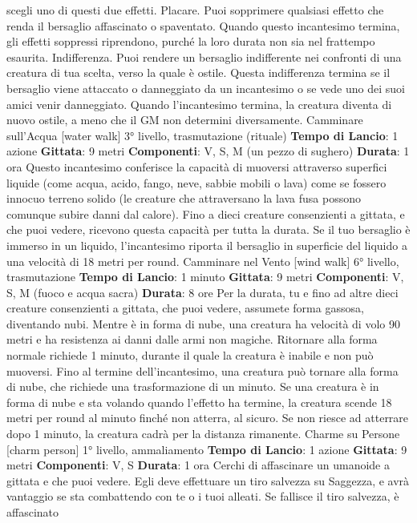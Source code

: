 \begin{multicols}{2}
scegli uno di questi due effetti.
Placare. Puoi sopprimere qualsiasi effetto che renda il
bersaglio affascinato o spaventato. Quando questo
incantesimo termina, gli effetti soppressi riprendono,
purché la loro durata non sia nel frattempo esaurita.
Indifferenza. Puoi rendere un bersaglio indifferente nei
confronti di una creatura di tua scelta, verso la quale è
ostile. Questa indifferenza termina se il bersaglio viene
attaccato o danneggiato da un incantesimo o se vede
uno dei suoi amici venir danneggiato. Quando
l’incantesimo termina, la creatura diventa di nuovo
ostile, a meno che il GM non determini diversamente.
Camminare sull’Acqua
[water walk]
3° livello, trasmutazione (rituale)
\textbf{Tempo di Lancio}: 1 azione
\textbf{Gittata}: 9 metri
\textbf{Componenti}: V, S, M (un pezzo di sughero)
\textbf{Durata}: 1 ora
Questo incantesimo conferisce la capacità di muoversi
attraverso superfici liquide (come acqua, acido, fango,
neve, sabbie mobili o lava) come se fossero innocuo
terreno solido (le creature che attraversano la lava fusa
possono comunque subire danni dal calore). Fino a
dieci creature consenzienti a gittata, e che puoi vedere,
ricevono questa capacità per tutta la durata.
Se il tuo bersaglio è immerso in un liquido,
l’incantesimo riporta il bersaglio in superficie del liquido
a una velocità di 18 metri per round.
Camminare nel Vento
[wind walk]
6° livello, trasmutazione
\textbf{Tempo di Lancio}: 1 minuto
\textbf{Gittata}: 9 metri
\textbf{Componenti}: V, S, M (fuoco e acqua sacra)
\textbf{Durata}: 8 ore
Per la durata, tu e fino ad altre dieci creature
consenzienti a gittata, che puoi vedere, assumete forma
gassosa, diventando nubi. Mentre è in forma di nube,
una creatura ha velocità di volo 90 metri e ha resistenza
ai danni dalle armi non magiche. Ritornare alla forma
normale richiede 1 minuto, durante il quale la creatura è
inabile e non può muoversi. Fino al termine
dell’incantesimo, una creatura può tornare alla forma di
nube, che richiede una trasformazione di un minuto.
Se una creatura è in forma di nube e sta volando
quando l’effetto ha termine, la creatura scende 18 metri
per round al minuto finché non atterra, al sicuro. Se non
riesce ad atterrare dopo 1 minuto, la creatura cadrà per
la distanza rimanente.
Charme su Persone
[charm person]
1° livello, ammaliamento
\textbf{Tempo di Lancio}: 1 azione
\textbf{Gittata}: 9 metri
\textbf{Componenti}: V, S
\textbf{Durata}: 1 ora
Cerchi di affascinare un umanoide a gittata e che puoi
vedere. Egli deve effettuare un tiro salvezza su
Saggezza, e avrà vantaggio se sta combattendo con te
o i tuoi alleati. Se fallisce il tiro salvezza, è affascinato

\end{multicols}
